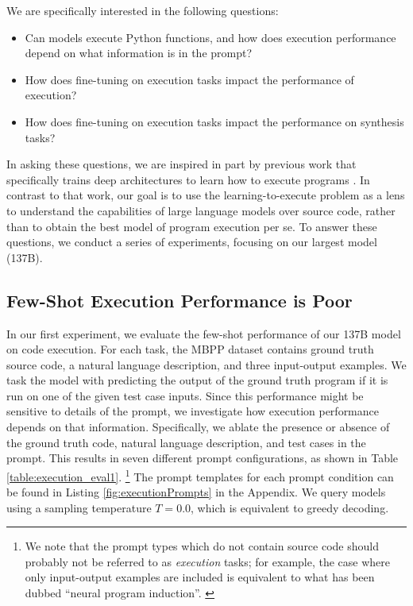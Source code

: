 We are specifically interested in the following questions:

\begin{itemize}
\item Can models execute Python functions, and how does execution performance depend on what information is in the prompt?
\item How does fine-tuning on execution tasks impact the performance of execution?
\item How does fine-tuning on execution tasks impact the performance on synthesis tasks?
\end{itemize}

In asking these questions, we are inspired in part by previous work that specifically trains deep architectures to learn how to execute programs \citep{Zaremba2014LearningTE,NEURIPS2020_Bieber}. In contrast to that work, our goal is to use the learning-to-execute problem as a lens to understand the capabilities of large language models over source code, rather than to obtain the best model of program execution per se. To answer these questions, we conduct a series of experiments, focusing on our largest model (137B).

\subsection{Few-Shot Execution Performance is Poor}
\label{sec:execution_fs}

In our first experiment, we evaluate the few-shot performance of our 137B model on code execution. For each task, the MBPP dataset  contains ground truth source code, a natural language description, and three input-output examples. We task the model with predicting the output of the ground truth program if it is run on one of the given test case inputs. Since this performance might be sensitive to details of the prompt, we investigate how execution performance depends on that information. Specifically, we ablate the presence or absence of the ground truth code, natural language description, and test cases in the prompt. This results in seven different prompt configurations, as shown in Table \ref{table:execution_eval1}.
\footnote{
We note that the prompt types which do not contain source code should probably not be referred to as \textit{execution} tasks; for example, the case where only input-output examples are included is equivalent to what has been dubbed ``neural program induction''. \citep{ROBUSTFILL} } The prompt templates for each prompt condition can be found in Listing \ref{fig:executionPrompts} in the Appendix. We query models using a sampling temperature $T=0.0$, which is equivalent to greedy decoding. 

